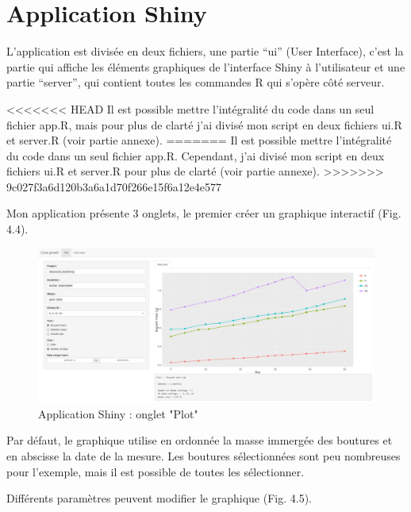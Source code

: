 \documentclass[]{report}
\begin{document}
\section{Application Shiny}\label{application-shiny}

L'application est divisée en deux fichiers, une partie ``ui'' (User
Interface), c'est la partie qui affiche les éléments graphiques de
l'interface Shiny à l'utilisateur et une partie ``server'', qui contient
toutes les commandes R qui s'opère côté serveur.

<<<<<<< HEAD
Il est possible mettre l'intégralité du code dans un seul fichier app.R,
mais pour plus de clarté j'ai divisé mon script en deux fichiers ui.R et
server.R (voir partie annexe).
=======
Il est possible mettre l'intégralité du code dans un seul fichier app.R.
Cependant, j'ai divisé mon script en deux fichiers ui.R et server.R pour
plus de clarté (voir partie annexe).
>>>>>>> 9c027f3a6d120b3a6a1d70f266e15f6a12e4e577

\vspace{1 cm}

Mon application présente 3 onglets, le premier créer un graphique
interactif (Fig. 4.4).

\begin{figure}[h!]
\includegraphics[]{../image/notebook-plot1.PNG}
\caption{Application Shiny : onglet "Plot"}
\end{figure}

\vspace{0.5 cm}

Par défaut, le graphique utilise en ordonnée la masse immergée des
boutures et en abscisse la date de la mesure. Les boutures sélectionnées
sont peu nombreuses pour l'exemple, mais il est possible de toutes les
sélectionner.

\vspace{0.5 cm}

Différents paramètres peuvent modifier le graphique (Fig. 4.5).
\end{document}
